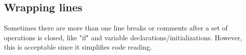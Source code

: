 \subsection{Wrapping lines}

Sometimes there are more than one line breaks or comments after a set of operations is closed,
like "if" and variable declarations/initializations. However, this is acceptable since it simplifies code reading.

